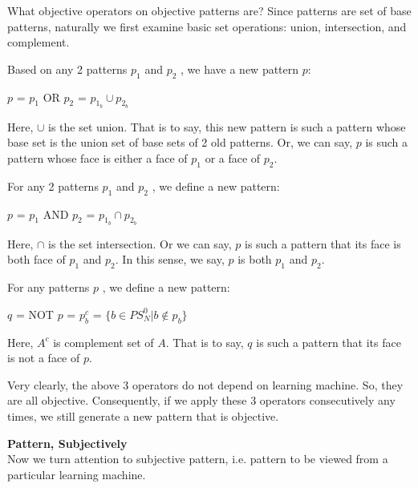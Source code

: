 What objective operators on objective patterns are? Since patterns are set of base patterns, naturally we first examine basic set operations: union, intersection, and complement.


\begin{definition}
Based on any 2 patterns $p_1$ and $p_2$ , we have a new pattern $p$: 
\end{definition}
\begin{center}
$p$ = $p_1$ OR $p_2$ = $p_{1_b} \cup p_{2_b}$ 
\end{center}

Here, $\cup$ is the set union. That is to say, this new pattern is such a pattern whose base set is the union set of base sets of 2 old patterns. Or, we can say, $p$ is such a pattern whose face is either a face of $p_1$ or a face of $p_2$. 



\begin{definition}
For any 2 patterns $p_1$ and $p_2$ , we define a new pattern: 
\end{definition}
\begin{center}
$p$ = $p_1$ AND $p_2$ = $p_{1_b} \cap p_{2_b}$ 
\end{center}
 
Here, $\cap$ is the set intersection. Or we can say, $p$ is such a pattern that its face is both face of $p_1$ and $p_2$. In this sense, we say, $p$ is both $p_1$ and $p_2$. 



\begin{definition}
For any patterns $p$ , we define a new pattern: 
\end{definition}
\begin{center}
$q$ = NOT $p$ = $p_{b} ^c$ = $\{ b \in PS^0_N | b \not \in p_{b} \}$  
\end{center}

Here, $A^c$ is complement set of $A$. That is to say, $q$ is such a pattern that its face is not a face of $p$.  

Very clearly, the above 3 operators do not depend on learning machine. So, they are all objective. Consequently, if we apply these 3 operators consecutively any times, we still generate a new pattern that is objective. 
\bigskip



{\bf Pattern, Subjectively} \\
Now we turn attention to subjective pattern, i.e. pattern to be viewed from a particular learning machine.

